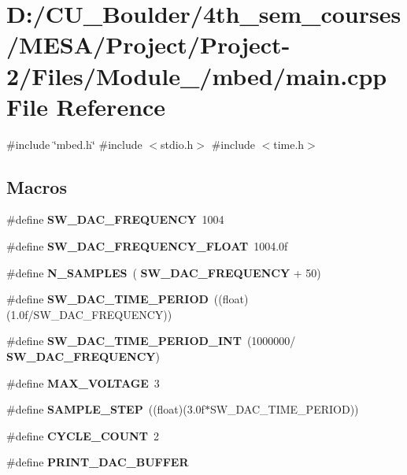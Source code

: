 \section{D\+:/\+C\+U\+\_\+\+Boulder/4th\+\_\+sem\+\_\+courses/\+M\+E\+S\+A/\+Project/\+Project-\/2/\+Files/\+Module\+\_/mbed/main.cpp File Reference}
\label{main_8cpp}
{\ttfamily \#include \char`\"{}mbed.\+h\char`\"{}}\newline
{\ttfamily \#include $<$stdio.\+h$>$}\newline
{\ttfamily \#include $<$time.\+h$>$}\newline
\subsection*{Macros}
\begin{DoxyCompactItemize}
\item 
\#define \textbf{ S\+W\+\_\+\+D\+A\+C\+\_\+\+F\+R\+E\+Q\+U\+E\+N\+CY}~1004
\item 
\#define \textbf{ S\+W\+\_\+\+D\+A\+C\+\_\+\+F\+R\+E\+Q\+U\+E\+N\+C\+Y\+\_\+\+F\+L\+O\+AT}~1004.\+0f
\item 
\#define \textbf{ N\+\_\+\+S\+A\+M\+P\+L\+ES}~(\textbf{ S\+W\+\_\+\+D\+A\+C\+\_\+\+F\+R\+E\+Q\+U\+E\+N\+CY} + 50)
\item 
\#define \textbf{ S\+W\+\_\+\+D\+A\+C\+\_\+\+T\+I\+M\+E\+\_\+\+P\+E\+R\+I\+OD}~((float)(1.\+0f/\+S\+W\+\_\+\+D\+A\+C\+\_\+\+F\+R\+E\+Q\+U\+E\+N\+C\+Y))
\item 
\#define \textbf{ S\+W\+\_\+\+D\+A\+C\+\_\+\+T\+I\+M\+E\+\_\+\+P\+E\+R\+I\+O\+D\+\_\+\+I\+NT}~(1000000/\textbf{ S\+W\+\_\+\+D\+A\+C\+\_\+\+F\+R\+E\+Q\+U\+E\+N\+CY})
\item 
\#define \textbf{ M\+A\+X\+\_\+\+V\+O\+L\+T\+A\+GE}~3
\item 
\#define \textbf{ S\+A\+M\+P\+L\+E\+\_\+\+S\+T\+EP}~((float)(3.\+0f$\ast$\+S\+W\+\_\+\+D\+A\+C\+\_\+\+T\+I\+M\+E\+\_\+\+P\+E\+R\+I\+O\+D))
\item 
\#define \textbf{ C\+Y\+C\+L\+E\+\_\+\+C\+O\+U\+NT}~2
\item 
\#define \textbf{ P\+R\+I\+N\+T\+\_\+\+D\+A\+C\+\_\+\+B\+U\+F\+F\+ER}
\end{DoxyCompactItemize}

